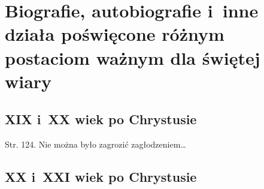 \documentclass[a4paper,11pt]{article}
\begin{document}
\vspace{\spaceOne}










\newpage

\section{Biografie, autobiografie i~inne działa poświęcone
  różnym postaciom ważnym dla świętej wiary}

\vspace{\spaceTwo}



\subsection{XIX i~XX wiek po Chrystusie}

\vspace{\spaceThree}







Str. 124. Nie można było zagrozić zagłodzeniem\ldots


\vspace{\spaceTwo}










\subsection{XX i~XXI wiek po Chrystusie}

\vspace{\spaceThree}



\end{document}
